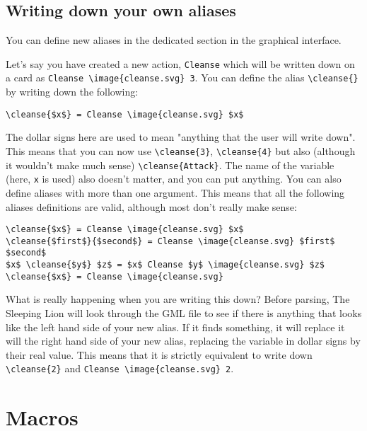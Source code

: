 \documentclass{article}
\begin{document}


\subsection{Writing down your own aliases}
You can define new aliases in the dedicated section in the graphical interface.

Let's say you have created a new action, \verb`Cleanse` which will be written down on a card as \verb`Cleanse \image{cleanse.svg} 3`. You can define the alias \verb`\cleanse{}` by writing down the following:

\begin{center}
\begin{BVerbatim}
\cleanse{$x$} = Cleanse \image{cleanse.svg} $x$
\end{BVerbatim}
\end{center}

The dollar signs here are used to mean "anything that the user will write down". This means that you can now use \verb`\cleanse{3}`, \verb`\cleanse{4}` but also (although it wouldn't make much sense) \verb`\cleanse{Attack}`. The name of the variable (here, \verb`x` is used) also doesn't matter, and you can put anything. You can also define aliases with more than one argument. This means that all the following aliases definitions are valid, although most don't really make sense:

\begin{center}
\begin{BVerbatim}
\cleanse{$x$} = Cleanse \image{cleanse.svg} $x$
\cleanse{$first$}{$second$} = Cleanse \image{cleanse.svg} $first$ $second$
$x$ \cleanse{$y$} $z$ = $x$ Cleanse $y$ \image{cleanse.svg} $z$
\cleanse{$x$} = Cleanse \image{cleanse.svg}
\end{BVerbatim}
\end{center}

What is really happening when you are writing this down? Before parsing, The Sleeping Lion will look through the GML file to see if there is anything that looks like the left hand side of your new alias. If it finds something, it will replace it will the right hand side of your new alias, replacing the variable in dollar signs by their real value. This means that it is strictly equivalent to write down \verb`\cleanse{2}` and \verb`Cleanse \image{cleanse.svg} 2`.

\pagebreak

\section{Macros}
\end{document}
